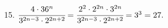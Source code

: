 15. $\cfrac{4\cdot36^n}{3^{2n-3}\cdot2^{2n+2}}=\cfrac{2^2\cdot2^{2n}\cdot3^{2n}}{3^{2n-3}\cdot2^{2n+2}}=3^3=27.$\\
